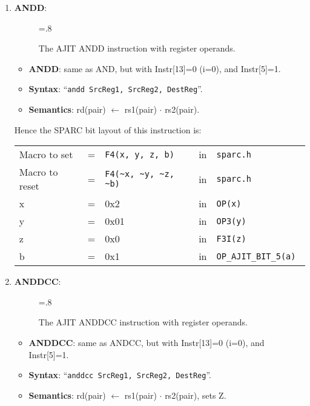 \begin{enumerate}
\item \textbf{ANDD}:\\
  \begin{center}
    \begin{figure}[h]
      \centering
      \epsfxsize=.8\linewidth
      \caption{The AJIT ANDD instruction  with register operands.}
      \label{fig:ajit:andd:insn}
    \end{figure}
  \end{center}
  \begin{itemize}
  \item []\textbf{ANDD}: same as AND, but with Instr[13]=0 (i=0), and
    Instr[5]=1.
  \item []\textbf{Syntax}: ``\texttt{andd  SrcReg1, SrcReg2, DestReg}''.
  \item []\textbf{Semantics}: rd(pair) $\leftarrow$ rs1(pair) $\cdot$ rs2(pair).
  \end{itemize}

  Hence the SPARC bit layout of this instruction is:

  \begin{tabular}[h]{lclcl}
    Macro to set   &=&  \verb|F4(x, y, z, b)|     &in& \verb|sparc.h|     \\
    Macro to reset &=&  \verb|F4(~x, ~y, ~z, ~b)| &in& \verb|sparc.h|     \\
    x              &=& 0x2                        &in& \verb|OP(x) | \\
    y              &=& 0x01                       &in& \verb|OP3(y) | \\
    z              &=& 0x0                        &in& \verb|F3I(z) | \\
    b              &=& 0x1                        &in& \verb|OP_AJIT_BIT_5(a) |
  \end{tabular}

\item \textbf{ANDDCC}:\\
  \begin{center}
    \begin{figure}[h]
      \centering
      \epsfxsize=.8\linewidth
      \caption{The AJIT ANDDCC instruction  with register operands.}
      \label{fig:ajit:anddcc:insn}
    \end{figure}
  \end{center}
  \begin{itemize}
  \item []\textbf{ANDDCC}: same as ANDCC, but with Instr[13]=0 (i=0), and
    Instr[5]=1.
  \item []\textbf{Syntax}: ``\texttt{anddcc  SrcReg1, SrcReg2, DestReg}''.
  \item []\textbf{Semantics}: rd(pair) $\leftarrow$ rs1(pair) $\cdot$
    rs2(pair), sets Z.
  \end{itemize}


\end{enumerate}
